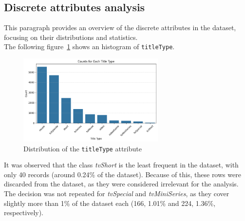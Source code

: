 \subsection{Discrete attributes analysis}
This paragraph provides an overview of the discrete attributes in the dataset, focusing on their distributions and statistics.\\
The following figure~\ref{fig:titleType_distrib} shows an histogram of \texttt{titleType}.
\begin{figure}[H]
    \centering
    \includegraphics[width=0.65\textwidth]{plots/types_count.png}     %
    \caption{Distribution of the \texttt{titleType} attribute}
    \label{fig:titleType_distrib}
\end{figure}
It was observed that the class \textit{tvShort} is the least frequent in the dataset, with only 40 records (around 0.24\% of the dataset). Because of this, these rows were discarded from the dataset, as they were considered irrelevant for the analysis.
The decision was not repeated for \textit{tvSpecial} and \textit{tvMiniSeries}, as they cover slightly more than 1\% of the dataset each (166, 1.01\% and 224, 1.36\%, respectively).\\




